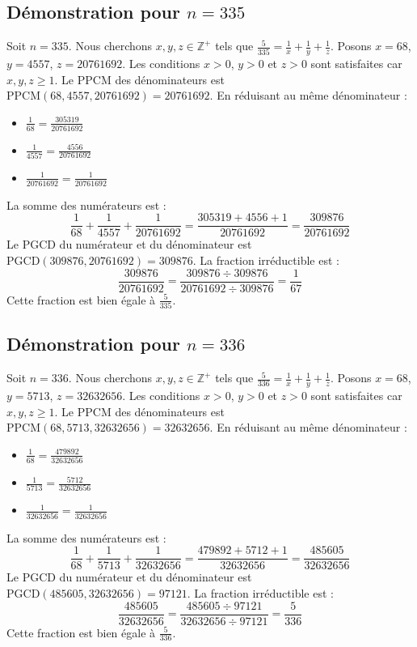 \documentclass[11pt,a4paper]{article}
\begin{document}
\subsection{Démonstration pour $n = 335$}
Soit $n = 335$. Nous cherchons $x, y, z \in \mathbb{Z}^{+}$ tels que $\frac{5}{335} = \frac{1}{x} + \frac{1}{y} + \frac{1}{z}$.
Posons $x = 68$, $y = 4557$, $z = 20761692$.
Les conditions $x > 0$, $y > 0$ et $z > 0$ sont satisfaites car $x, y, z \geq 1$.
Le PPCM des dénominateurs est $\text{PPCM}(68, 4557, 20761692) = 20761692$.
En réduisant au même dénominateur :
\begin{itemize}
    \item $\frac{1}{68} = \frac{305319}{20761692}$
    \item $\frac{1}{4557} = \frac{4556}{20761692}$
    \item $\frac{1}{20761692} = \frac{1}{20761692}$
\end{itemize}
La somme des numérateurs est :
$$ \frac{1}{68} + \frac{1}{4557} + \frac{1}{20761692} = \frac{305319 + 4556 + 1}{20761692} = \frac{309876}{20761692} $$
Le PGCD du numérateur et du dénominateur est $\text{PGCD}(309876, 20761692) = 309876$.
La fraction irréductible est :
$$ \frac{309876}{20761692} = \frac{309876 \div 309876}{20761692 \div 309876} = \frac{1}{67} $$
Cette fraction est bien égale à $\frac{5}{335}$.

\subsection{Démonstration pour $n = 336$}
Soit $n = 336$. Nous cherchons $x, y, z \in \mathbb{Z}^{+}$ tels que $\frac{5}{336} = \frac{1}{x} + \frac{1}{y} + \frac{1}{z}$.
Posons $x = 68$, $y = 5713$, $z = 32632656$.
Les conditions $x > 0$, $y > 0$ et $z > 0$ sont satisfaites car $x, y, z \geq 1$.
Le PPCM des dénominateurs est $\text{PPCM}(68, 5713, 32632656) = 32632656$.
En réduisant au même dénominateur :
\begin{itemize}
    \item $\frac{1}{68} = \frac{479892}{32632656}$
    \item $\frac{1}{5713} = \frac{5712}{32632656}$
    \item $\frac{1}{32632656} = \frac{1}{32632656}$
\end{itemize}
La somme des numérateurs est :
$$ \frac{1}{68} + \frac{1}{5713} + \frac{1}{32632656} = \frac{479892 + 5712 + 1}{32632656} = \frac{485605}{32632656} $$
Le PGCD du numérateur et du dénominateur est $\text{PGCD}(485605, 32632656) = 97121$.
La fraction irréductible est :
$$ \frac{485605}{32632656} = \frac{485605 \div 97121}{32632656 \div 97121} = \frac{5}{336} $$
Cette fraction est bien égale à $\frac{5}{336}$.
\end{document}
